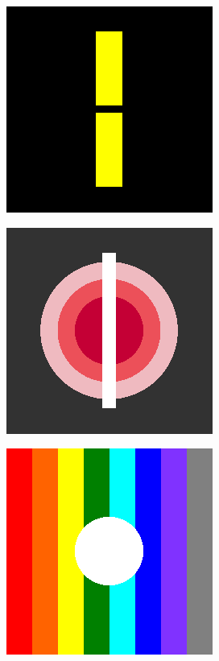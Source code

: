 \begin{figure}[H]
    \centering
    \begin{subfigure}{\ResultSubFigureWidth \linewidth}
        \centering
        \includegraphics[width=\ResultSubFigurePadding \linewidth]{image/image_inpaint_synthetic/case01-toinpaint.png}
    \end{subfigure}
    \begin{subfigure}{\ResultSubFigureWidth \linewidth}
        \centering
        \includegraphics[width=\ResultSubFigurePadding \linewidth]{image/image_inpaint_synthetic/case02-toinpaint.png}
    \end{subfigure}
    \begin{subfigure}{\ResultSubFigureWidth \linewidth}
        \centering
        \includegraphics[width=\ResultSubFigurePadding \linewidth]{image/image_inpaint_synthetic/case03-toinpaint.png}		

\end{subfigure}
\end{figure}
